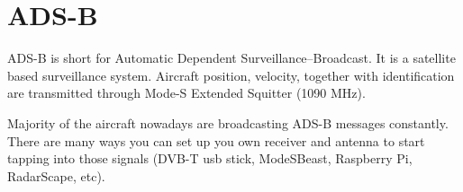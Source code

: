 \chapter{ADS-B}

ADS-B is short for Automatic Dependent Surveillance–Broadcast. It is a satellite based surveillance system. Aircraft position, velocity, together with identification are transmitted through Mode-S Extended Squitter (1090 MHz).

Majority of the aircraft nowadays are broadcasting ADS-B messages constantly. There are many ways you can set up you own receiver and antenna to start tapping into those signals (DVB-T usb stick, ModeSBeast, Raspberry Pi, RadarScape, etc).
